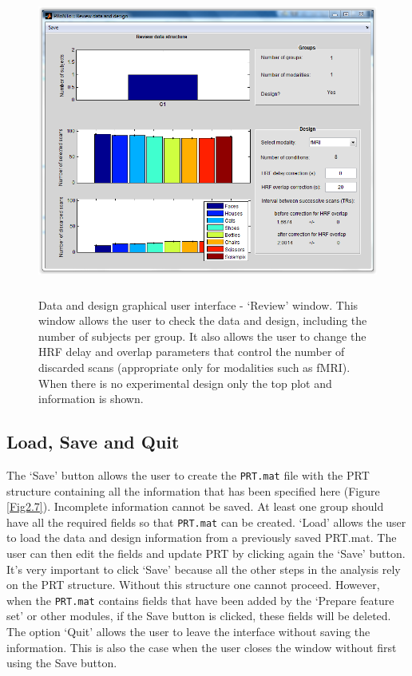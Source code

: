 \begin{figure}[!h]
  \begin{center}
      \includegraphics[height=4in]{images/Figure8.png}
   \caption{Data and design graphical user interface - `Review' window. This window allows the user to check the data and design, including the number of subjects per group. It also allows the user to change the HRF delay and overlap parameters that control the number of discarded scans (appropriate only for modalities such as fMRI). When there is no experimental design only the top plot and information is shown.}
    \label{Fig2.8}
  \end{center}
\end{figure}

\subsection{Load, Save and Quit}

The `Save' button allows the user to create the {\tt PRT.mat} file with the PRT structure containing all the information that has been specified here (Figure \ref{Fig2.7}). Incomplete information cannot be saved. At least one group should have all the required fields so that {\tt PRT.mat} can be created. `Load' allows the user to load the data and design information from a previously saved PRT.mat. The user can then edit the fields and update PRT by clicking again the `Save' button. It's very important to click `Save' because all the other steps in the analysis rely on the PRT structure. Without this structure one cannot proceed. However, when the {\tt PRT.mat} contains fields that have been added by the `Prepare feature set' or other modules, if the Save button is clicked, these fields will be deleted. The option `Quit' allows the user to leave the interface without saving the information. This is also the case when the user closes the window without first using the Save button.

